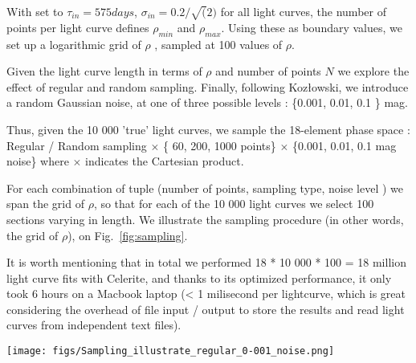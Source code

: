 \documentclass[fleqn,usenatbib]{mnras}  %
\begin{document}
With set to  $\tau_{in} = 575 days$, $\sigma_{in} = 0.2 / \sqrt(2)$  for all light curves,  the number of points per light curve defines $\rho_{min}$ and $\rho_{max}$. Using these as boundary values, we set up a logarithmic grid of $\rho$ , sampled at 100 values of $\rho$.  

Given the light curve length in terms of $\rho$ and number of points $N$ we explore the effect of  regular and  random sampling. Finally, following Koz{\l}owski, we introduce a random Gaussian noise, at one of three possible levels :  \{0.001, 0.01, 0.1 \} mag.  

Thus, given the 10 000 'true' light curves, we sample the 18-element phase space  : { Regular / Random sampling  } $\times$   \{ 60, 200, 1000 points\} $\times$ \{0.001, 0.01, 0.1 mag noise\} where $\times$   indicates the Cartesian product. 

For each combination of tuple (number of points, sampling type, noise level ) we span the grid of $\rho$, so that for each of the 10 000 light curves we select 100  sections varying in length. We illustrate the sampling procedure (in other words, the grid of $\rho$), on Fig.~\ref{fig:sampling}. 

It is worth mentioning that in total we performed 18 * 10 000 * 100  = 18 million  light curve fits with Celerite, and thanks to its optimized performance, it only took 6 hours on a Macbook laptop  (< 1 milisecond per lightcurve, which is great considering the overhead of file input / output to store the results and read light curves from independent text files).  
    

\begin{figure*}
\texttt{[image: figs/Sampling\_illustrate\_regular\_0-001\_noise.png]}
\caption{We illustrate the process of selecting different sections of a light curve, depending on the desired number of points N, and length of section : $\rho$. Here we chose regular sampling, and negligible 0.001 mag noise, but the principle is exactly the same regardless of noise level or sampling procedure. From left to right, we sample $N \in {1000,200,60}$ points. Focusing on a single column, from top to bottom we sample on a logarithmic grid of $\rho$. The smallest $\rho$ is set by the maximum attainable light curve section, which corresponds to the full length $l = 100 \tau$, and since $\rho = 1 / l$, $\rho_{min} = 0.01$. The largest $\rho$ is related to the shortest possible light curve section conditional on the number of points chosen. Thus choosing $N \in {1000,200,60}$ days, the shortest possible sections are $l \in {1000,200,60}$ days given that we have adopted the $\Delta t = 1 $ day in 'true' light curve.}
\label{fig:sampling}
\end{figure*} 
\end{document}
